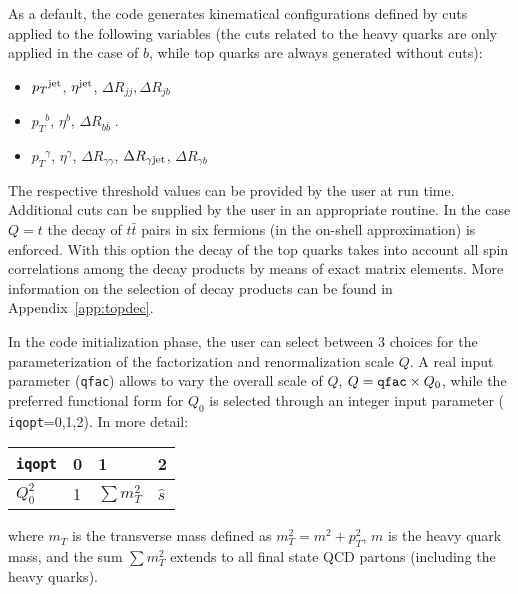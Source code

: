 \documentclass[paper]{JHEP3}
\def    \bbar   {\bar{b}}
\def    \pt             {\mbox{$p_T$}}
\def    \ptsq           {\mbox{$p^2_T$}}
\def    \mT             {\mbox{$m_T$}}
\def    \mTsq           {\mbox{$m^2_T$}}
\begin{document}
As a default, the code generates kinematical configurations defined by
cuts applied to the following variables (the cuts related to the heavy
quarks are only applied in the case of $b$, while top quarks are
always generated without cuts):
\begin{itemize}
\item $\pt^{\rm jet}$, $\eta^{\rm jet}$, $\Delta R_{jj},\Delta R_{jb}$
\item $\pt^{ b}$, $\eta^{ b}$, $\Delta R_{b\bbar} \; .$
\item $\pt^{\gamma}$, $\eta^\gamma$, $\Delta R_{\gamma \gamma}$, 
      $\Delta R_{\gamma {\rm jet}}$, $\Delta R_{\gamma b}$
\end{itemize}
The respective threshold values can be provided by the user at run
time. Additional cuts can be supplied by the user in an appropriate
routine. In the case $Q=t$ the decay of $t \bar t$ pairs in six fermions 
(in the on-shell approximation) is enforced.
With this option the decay of the top quarks takes into account 
all spin correlations among the decay products by means of exact 
matrix elements. More information on the selection of decay products can 
be found in Appendix~\ref{app:topdec}.

In the code initialization phase, the user can select 
between 3 choices for the parameterization of the 
factorization and renormalization scale $Q$. A real input
parameter ({\tt qfac}) allows to vary the overall scale of $Q$,
$Q={\tt qfac}\times Q_0$, while the preferred functional form for
$Q_0$ is selected through an integer input parameter ({\tt
iqopt}=0,1,2).  In more detail:
{\renewcommand{\arraystretch}{1.2}
\begin{center}
\begin{tabular}{l||l|l|l}
{\tt iqopt} & 0 & 1 & 2\\  \hline
$Q_0^2$ & 1 & $\sum \mTsq$ & $\hat{s}$ \\
\end{tabular}
\end{center}}
where $\mT$ is the transverse mass defined as $\mTsq=m^2+\ptsq$,
$m$ is the heavy quark mass, and the sum $\sum \mTsq $ extends to all final
state QCD partons (including the heavy quarks).
\end{document}
